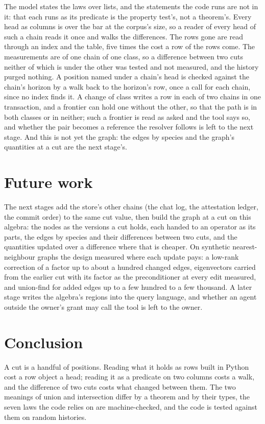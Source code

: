 \documentclass[11pt]{article}
\theoremstyle{plain}
\theoremstyle{definition}
\begin{document}
The model states the laws over lists, and the statements the code runs are not in it: that each
runs as its predicate is the property test's, not a theorem's. Every head as columns is over the
bar at the corpus's size, so a reader of every head of such a chain reads it once and walks the
differences. The rows gone are read through an index and the table, five times the cost a row of
the rows come. The measurements are of one chain of one class, so a difference between two cuts
neither of which is under the other was tested and not measured, and the history purged nothing.
A position named under a chain's head is checked against the chain's horizon by a walk back to
the horizon's row, once a call for each chain, since no index finds it. A change of class writes
a row in each of two chains in one transaction, and a frontier can hold one without the other,
so that the path is in both classes or in neither; such a frontier is read as asked and the tool
says so, and whether the pair becomes a reference the resolver follows is left to the next
stage. And this is not yet the graph: the edges by species and the graph's quantities at a cut
are the next stage's.

\section{Future work}

The next stages add the store's other chains (the chat log, the attestation ledger, the commit
order) to the same cut value, then build the graph at a cut on this algebra: the nodes as the
versions a cut holds, each handed to an operator as its parts, the edges by species and their
differences between two cuts, and the quantities updated over a difference where that is cheaper.
On synthetic nearest-neighbour graphs the design measured where each update pays: a low-rank
correction of a factor up to about a hundred changed edges, eigenvectors carried from the earlier
cut with its factor as the preconditioner at every edit measured, and union-find for added edges
up to a few hundred to a few thousand. A later stage writes the algebra's regions into the query
language, and whether an agent outside the owner's grant may call the tool is left to the owner.

\section{Conclusion}

A cut is a handful of positions. Reading what it holds as rows built in Python cost a row object
a head; reading it as a predicate on two columns costs a walk, and the difference of two cuts
costs what changed between them. The two meanings of union and intersection differ by a theorem
and by their types, the seven laws the code relies on are machine-checked, and the code is tested
against them on random histories.



\end{document}
